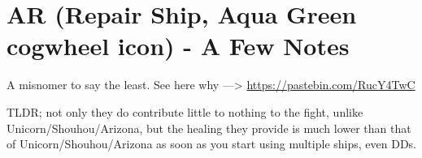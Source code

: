\newpage
\section[AR]{AR (Repair Ship, Aqua Green cogwheel icon) - A Few Notes}

A misnomer to say the least. See here why ---> \url{https://pastebin.com/RucY4TwC}

TLDR; not only they do contribute little to nothing to the fight, unlike Unicorn/Shouhou/Arizona, but the healing they provide is much lower than that of Unicorn/Shouhou/Arizona as soon as you start using multiple ships, even DDs.
